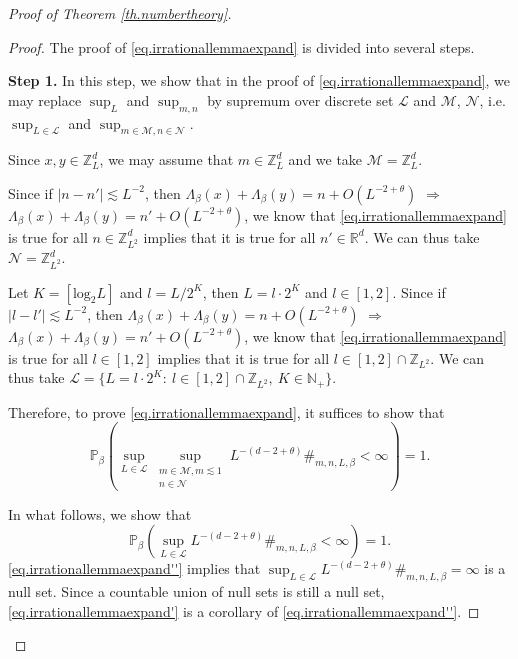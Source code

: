 \begin{proof}[Proof of Theorem \ref{th.numbertheory}]
\begin{proof}
The proof of \eqref{eq.irrationallemmaexpand} is divided into several steps.

\textbf{Step 1.} In this step, we show that in the proof of \eqref{eq.irrationallemmaexpand}, we may replace $\sup_{L}$ and $\sup_{m,n}$ by supremum over discrete set $\mathcal{L}$ and $\mathcal{M}$, $\mathcal{N}$, i.e. $\sup_{L\in \mathcal{L}}$ and $\sup_{m\in\mathcal{M},n\in\mathcal{N}}$.

Since $x,y\in \mathbb{Z}_L^d$, we may assume that $m\in \mathbb{Z}_{L}^d$ and we take $\mathcal{M}=\mathbb{Z}_{L}^d$.

Since if $|n-n'|\lesssim L^{-2}$, then $\Lambda_{\beta}(x)+\Lambda_{\beta}(y)=n+O(L^{-2+\theta})$ $\Rightarrow$ $\Lambda_{\beta}(x)+\Lambda_{\beta}(y)=n'+O(L^{-2+\theta})$, we know that \eqref{eq.irrationallemmaexpand} is true for all $n\in\mathbb{Z}_{L^2}^d$ implies that it is true for all $n'\in\mathbb{R}^d$. We can thus take $\mathcal{N}=\mathbb{Z}_{L^2}^d$.

Let $K=[\text{log}_2 L]$ and $l=L/2^K$, then $L=l\cdot 2^K$ and $l\in [1,2]$. Since if $|l-l'|\lesssim L^{-2}$, then $\Lambda_{\beta}(x)+\Lambda_{\beta}(y)=n+O(L^{-2+\theta})$ $\Rightarrow$ $\Lambda_{\beta}(x)+\Lambda_{\beta}(y)=n'+O(L^{-2+\theta})$, we know that \eqref{eq.irrationallemmaexpand} is true for all $l\in [1,2]$ implies that it is true for all $l\in [1,2]\cap \mathbb{Z}_{L^2}$. We can thus take $\mathcal{L}=\{L=l\cdot 2^K:\ l\in [1,2]\cap \mathbb{Z}_{L^2},\ K\in \mathbb{N}_+\}$.

Therefore, to prove \eqref{eq.irrationallemmaexpand}, it suffices to show that 
\begin{equation}\label{eq.irrationallemmaexpand'}
    \mathbb{P}_{\beta}\left(\sup_{L\in \mathcal{L}}\sup_{\substack{m\in \mathcal{M},m\lesssim 1\\n\in \mathcal{N}}}  L^{-(d-2+\theta)}\#_{m,n,L,\beta} <\infty\right)=1.
\end{equation}

In what follows, we show that 
\begin{equation}\label{eq.irrationallemmaexpand''}
    \mathbb{P}_{\beta}\left(\sup_{L\in \mathcal{L}}L^{-(d-2+\theta)}\#_{m,n,L,\beta} <\infty \right)=1.
\end{equation}
\eqref{eq.irrationallemmaexpand''} implies that $\sup_{L\in \mathcal{L}}L^{-(d-2+\theta)}\#_{m,n,L,\beta} =\infty$ is a null set. Since a countable union of null sets is still a null set, \eqref{eq.irrationallemmaexpand'} is a corollary of \eqref{eq.irrationallemmaexpand''}.


\end{proof}
\end{proof}

